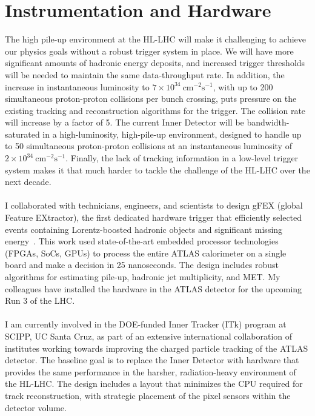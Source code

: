 \documentclass[10pt,a4paper,sans]{moderncv/moderncv} %
\begin{document}
\section{Instrumentation and Hardware}
The high pile-up environment at the HL-LHC will make it challenging to achieve our physics goals without a robust trigger system in place. We will have more significant amounts of hadronic energy deposits, and increased trigger thresholds will be needed to maintain the same data-throughput rate. In addition, the increase in instantaneous luminosity to $7 \times 10^{34}\ \mathrm{cm}^{-2}\mathrm{s}^{-1}$, with up to 200 simultaneous proton-proton collisions per bunch crossing, puts pressure on the existing tracking and reconstruction algorithms for the trigger. The collision rate will increase by a factor of 5. The current Inner Detector will be bandwidth-saturated in a high-luminosity, high-pile-up environment, designed to handle up to 50 simultaneous proton-proton collisions at an instantaneous luminosity of $2 \times 10^{34}\ \mathrm{cm}^{-2}\mathrm{s}^{-1}$. Finally, the lack of tracking information in a low-level trigger system makes it that much harder to tackle the challenge of the HL-LHC over the next decade.
\\
\\
I collaborated with technicians, engineers, and scientists to design gFEX (global Feature EXtractor), the first dedicated hardware trigger that efficiently selected events containing Lorentz-boosted hadronic objects and significant missing energy~\cite{Begel:2233958, Tang:2104248}. This work used state-of-the-art embedded processor technologies (FPGAs, SoCs, GPUs) to process the entire ATLAS calorimeter on a single board and make a decision in 25 nanoseconds. The design includes robust algorithms for estimating pile-up, hadronic jet multiplicity, and MET. My colleagues have installed the hardware in the ATLAS detector for the upcoming Run 3 of the LHC.
\\
\\
I am currently involved in the DOE-funded Inner Tracker (ITk) program at SCIPP, UC Santa Cruz, as part of an extensive international collaboration of institutes working towards improving the charged particle tracking of the ATLAS detector. The baseline goal is to replace the Inner Detector with hardware that provides the same performance in the harsher, radiation-heavy environment of the HL-LHC. The design includes a layout that minimizes the CPU required for track reconstruction, with strategic placement of the pixel sensors within the detector volume.
\end{document}
